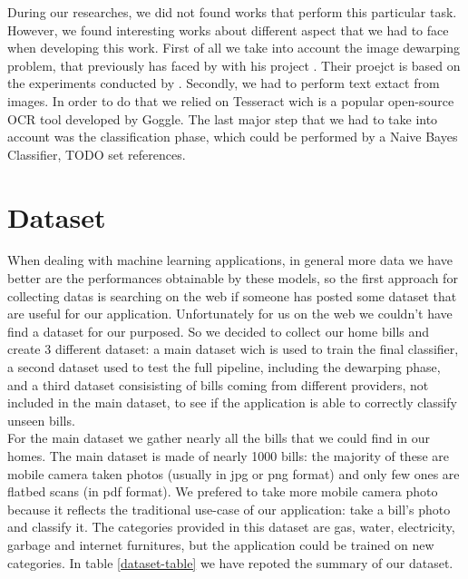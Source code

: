 \documentclass[10pt,twocolumn,letterpaper]{article}
\begin{document}
During our researches, we did not found works that perform this
particular task. However, we found interesting works about different
aspect that we had to face when developing this work.  First of all we
take into account the image dewarping problem, that previously has
faced by \cite{Improvingcamera-based} with his project
\cite{mobile-ocr}. Their proejct is based on the experiments conducted
by \cite{recoveringhomography}.  Secondly, we had to perform text
extact from images. In order to do that we relied on Tesseract
\cite{Tesseract} wich is a popular open-source OCR tool developed by
Goggle. The last major step that we had to take into account was the
classification phase, which could be performed by a Naive Bayes
Classifier, TODO set references.

\section{Dataset}
\label{sec:dataset}
When dealing with machine learning applications, in general more data we have  better are the performances obtainable by these models, so the first approach for collecting datas is searching on the web if someone has posted some dataset that are useful for our application. Unfortunately for us on the web we couldn't have find a dataset for our purposed. So we decided to collect our home bills and create 3 different dataset: a main dataset wich is used to train the final classifier, a second dataset used to test the full pipeline, including the dewarping phase, and a third dataset consisisting of bills coming from different providers, not included in the main dataset, to see if the application is able to correctly classify unseen bills.\\

For the main dataset we gather nearly all the bills that we could find in our homes. The main dataset is made of nearly 1000 bills: the majority of these are mobile camera taken photos (usually in jpg or png format) and only few ones are flatbed scans (in pdf format). We prefered to take more mobile camera photo because it reflects the traditional use-case of our application: take a bill's photo and classify it. The categories provided in this dataset are gas, water, electricity, garbage and internet furnitures, but the application could be trained on new categories. In table \ref{dataset-table} we have repoted the summary of our dataset.
\end{document}
